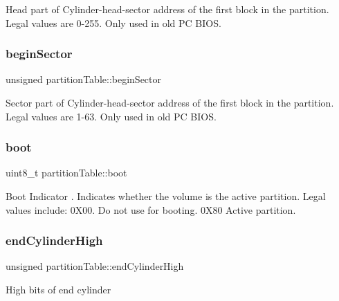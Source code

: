 Head part of Cylinder-\/head-\/sector address of the first block in the partition. Legal values are 0-\/255. Only used in old PC B\+I\+OS. \mbox{\label{structpartition_table_ae201c11d9671c9efc307c654a2b6c026}} 
\subsubsection{\texorpdfstring{begin\+Sector}{beginSector}}
{\footnotesize\ttfamily unsigned partition\+Table\+::begin\+Sector}

Sector part of Cylinder-\/head-\/sector address of the first block in the partition. Legal values are 1-\/63. Only used in old PC B\+I\+OS. \mbox{\label{structpartition_table_adf386afb1f33046d8b6a1a0afa780ec9}} 
\subsubsection{\texorpdfstring{boot}{boot}}
{\footnotesize\ttfamily uint8\+\_\+t partition\+Table\+::boot}

Boot Indicator . Indicates whether the volume is the active partition. Legal values include\+: 0\+X00. Do not use for booting. 0\+X80 Active partition. \mbox{\label{structpartition_table_a32fea225b8ffd925ad919ffc56e9abda}} 
\subsubsection{\texorpdfstring{end\+Cylinder\+High}{endCylinderHigh}}
{\footnotesize\ttfamily unsigned partition\+Table\+::end\+Cylinder\+High}

High bits of end cylinder \mbox{\label{structpartition_table_ad7829e34be70084abe145227b0d18274}} 

